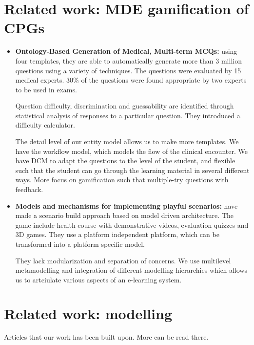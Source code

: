 \documentclass[20pt]{extarticle}
\begin{document}
	\section{Related work: MDE gamification of CPGs}
	\begin{itemize}
		\item \textbf{Ontology-Based Generation of Medical, Multi-term MCQs:} using four templates, they are able to automatically generate more than 3 million questions using a variety of techniques. The questions were evaluated by 15 medical experts. 30\% of the questions were found appropriate by two experts to be used in exams. 
		
		Question difficulty, discrimination and guessability are identified through statistical analysis of responses to a particular question. They introduced a difficulty calculator.
		
		The detail level of our entity model allows us to make more templates. We have the workflow model, which models the flow of the clinical encounter. We have DCM to adapt the questions to the level of the student, and flexible such that the student can go through the learning material in several different ways. More focus on gamification such that multiple-try questions with feedback.
		
		\item \textbf{Models and mechanisms for implementing playful scenarios:} have made a scenario build approach based on model driven architecture. The game include health course with demonstrative videos, evaluation quizzes and 3D games. They use a platform independent platform, which can be transformed into a platform specific model. 
		
		They lack modularization and separation of concerns. We use multilevel metamodelling and integration of different modelling hierarchies which allows us to artciulate various aspects of an e-learning system.
	\end{itemize}

\section{Related work: modelling}
Articles that our work has been built upon. More can be read there.
	

	
\end{document}
